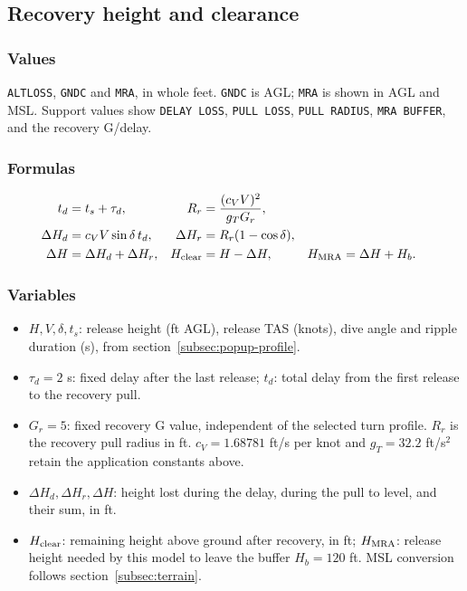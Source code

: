 \documentclass[10pt,a4paper]{amsart}
\begin{document}
\subsection{Recovery height and clearance}\label{subsec:popup-recovery}
\subsubsection*{Values}
\texttt{ALTLOSS}, \texttt{GNDC} and \texttt{MRA}, in whole feet.
\texttt{GNDC} is AGL; \texttt{MRA} is shown in AGL and MSL.
Support values show \texttt{DELAY LOSS}, \texttt{PULL LOSS},
\texttt{PULL RADIUS}, \texttt{MRA BUFFER}, and the recovery G/delay.

\subsubsection*{Formulas}
\begin{align*}
 t_d&=t_s+\tau_d,& R_r&=\frac{(c_VV)^2}{g_TG_r},\\
 \Delta H_d&=c_VV\sin\delta\,t_d,&
 \Delta H_r&=R_r(1-\cos\delta),\\
 \Delta H&=\Delta H_d+\Delta H_r,&
 H_{\rm clear}&=H-\Delta H,&
 H_{\rm MRA}&=\Delta H+H_b.
\end{align*}

\subsubsection*{Variables}
\begin{itemize}
\setlength{\itemsep}{0pt}
\setlength{\parsep}{0pt}
\item $H,V,\delta,t_s$: release height (ft AGL), release TAS (knots),
dive angle and ripple duration (s), from section~\ref{subsec:popup-profile}.
\item $\tau_d=2$ s: fixed delay after the last release; $t_d$:
total delay from the first release to the recovery pull.
\item $G_r=5$: fixed recovery G value, independent of the selected
turn profile. $R_r$ is the recovery pull radius in ft.
$c_V=1.68781$ ft/s per knot and $g_T=32.2$ ft/s$^2$ retain the
application constants above.
\item $\Delta H_d,\Delta H_r,\Delta H$: height lost during the delay,
during the pull to level, and their sum, in ft.
\item $H_{\rm clear}$: remaining height above ground after recovery,
in ft; $H_{\rm MRA}$: release height needed by this model to leave
the buffer $H_b=120$ ft. MSL conversion follows
section~\ref{subsec:terrain}.
\end{itemize}
\end{document}
